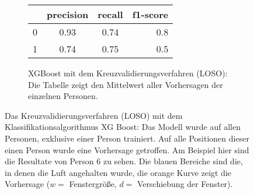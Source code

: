 \begin{figure}[H]
  \begin{subfigure}{1\textwidth}
      \begin{center}
          \begin{tabular}{ | l | c | c | r | }
            \hline
             & precision & recall & f1-score \\ \hline
            0 & 0.93 & 0.74 & 0.8 \\ \hline
            1 & 0.74 & 0.75 & 0.5 \\
            \hline
          \end{tabular}
      \end{center}
      \caption{XGBoost mit dem Kreuzvalidierungsverfahren (LOSO): Die Tabelle zeigt den Mittelwert aller Vorhersagen der einzelnen Personen.}
      \label{implementation:app:screenshots:user_studies_information}
  \end{subfigure}
    \caption{Das Kreuzvalidierungsverfahren (LOSO) mit dem Klassifikationsalgorithmus XG Boost: Das Modell wurde auf allen Personen, exklusive einer Person trainiert. Auf alle Positionen dieser einen Person wurde eine Vorhersage getroffen. Am Beispiel hier sind die Resultate von Person 6 zu sehen. Die blauen Bereiche sind die, in denen die Luft angehalten wurde, die orange Kurve zeigt die Vorhersage ($w=$ Fenstergröße, $d=$ Verschiebung der Fenster).}
\label{evaluation:xgboost_loso:person6}
\end{figure}

